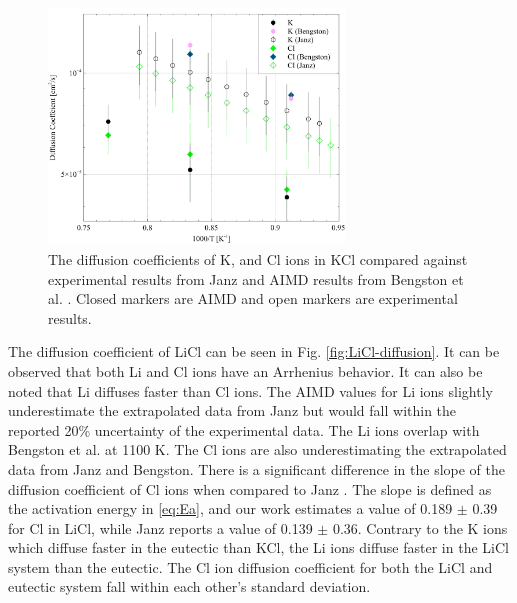 \documentclass[review]{elsarticle}
\begin{document}
\begin{figure}[h!]
 \centering
 \includegraphics[width=0.7\textwidth]{diff_kcl.jpg} 
 \caption{The diffusion coefficients of K, and Cl ions in KCl compared against experimental results from Janz \cite{janz_Diffusion} and AIMD results from Bengston et al. \cite{Bengston2014}. Closed markers are AIMD and open markers are experimental results.}
 \label{fig:KCl-diffusion}
\end{figure}

The diffusion coefficient of LiCl can be seen in Fig. \ref{fig:LiCl-diffusion}. It can be observed that both Li and Cl ions have an Arrhenius behavior. It can also be noted that Li diffuses faster than Cl ions. The AIMD values for Li ions slightly underestimate the extrapolated data from Janz \cite{janz_Diffusion} but would fall within the reported 20\% uncertainty of the experimental data. The Li ions overlap with Bengston et al. \cite{Bengston2014} at 1100 K. The Cl ions are also underestimating the extrapolated data from Janz and Bengston. There is a significant difference in the slope of the diffusion coefficient of Cl ions when compared to Janz \cite{janz_Diffusion}. The slope is defined as the activation energy in \cref{eq:Ea}, and our work estimates a value of 0.189 $\pm$ 0.39 for Cl in LiCl, while Janz reports a value of 0.139 $\pm$ 0.36. Contrary to the K ions which diffuse faster in the eutectic than KCl, the Li ions diffuse faster in the LiCl system than the eutectic. The Cl ion diffusion coefficient for both the LiCl and eutectic system fall within each other's standard deviation.
\end{document}

